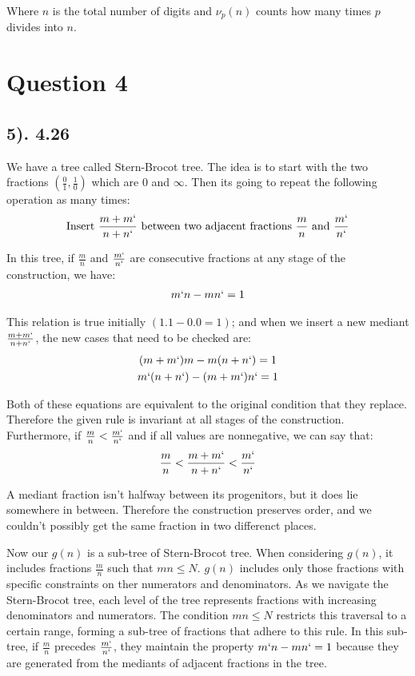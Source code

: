 \documentclass[12pt]{article}
\begin{document}
Where $n$ is the total number of digits and $\nu_p(n)$ counts how many times $p$ divides into $n$.

\section*{Question 4}
\subsection*{5). 4.26}
We have a tree called Stern-Brocot tree. The idea is to start with the two fractions
$(\frac{0}{1}, \frac{1}{0})$ which are $0$ and $\infty$. Then its going to repeat the following
operation as many times:
\begin{gather*}
    \text{Insert } \frac{m + m`}{n + n`} \text{ between two adjacent fractions } \frac{m}{n} \text{ and } \frac{m`}{n`}
\end{gather*}

In this tree, if $\frac{m}{n}$ and $\frac{m`}{n`}$ are consecutive fractions at any stage
of the construction, we have:
\begin{gather*}
    m`n - mn` = 1
\end{gather*}

This relation is true initially $(1.1 - 0.0 = 1)$; and when we insert a new
mediant $\frac{m + m`}{n + n`}$, the new cases that need to be checked are:
\begin{gather*}
    (m + m`)m - m(n + n`) = 1 \\
    m`(n + n`) - (m + m`)n` = 1
\end{gather*}

Both of these equations are equivalent to the original condition that they replace. Therefore
the given rule is invariant at all stages of the construction. Furthermore, if $\frac{m}{n} < \frac{m`}{n`}$
and if all values are nonnegative, we can say that:
\begin{gather*}
    \frac{m}{n} < \frac{m + m`}{n + n`} < \frac{m`}{n`}
\end{gather*}

A mediant fraction isn't halfway between its progenitors, but it does lie somewhere
in between. Therefore the construction preserves order, and we couldn't possibly
get the same fraction in two differenct places.

Now our $g(n)$ is a sub-tree of Stern-Brocot tree. When considering $g(n)$, it includes
fractions $\frac{m}{n}$ such that $mn \leq N$. $g(n)$ includes only those
fractions with specific constraints on ther numerators and denominators.
As we navigate the Stern-Brocot tree, each level of the tree represents fractions with increasing denominators and numerators. The condition 
$mn \leq N$ restricts this traversal to a certain range, forming a sub-tree of fractions that adhere to this rule.
In this sub-tree, if $\frac{m}{n}$ precedes $\frac{m`}{n`}$, they maintain the property $m`n - mn` = 1$
because they are generated from the mediants of adjacent fractions in the tree.
\end{document}
